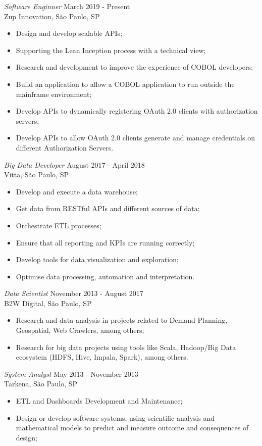 \documentclass[margin, 10pt]{res} %
\begin{document}
\begin{resume}
{\sl Software Enginner} \hfill March 2019 - Present \\
Zup Innovation, São Paulo, SP
\begin{itemize} \itemsep -2pt %
\item Design and develop scalable APIs;
\item Supporting the Lean Inception process with a technical view;
\item Research and development to improve the experience of COBOL developers;
\item Build an application to allow a COBOL application to run outside the mainframe environment;
\item Develop APIs to dynamically registering OAuth 2.0 clients with authorization servers;
\item Develop APIs to allow OAuth 2.0 clients generate and manage credentials on different Authorization Servers.
\end{itemize}

{\sl Big Data Developer} \hfill August 2017 - April 2018 \\
Vitta, São Paulo, SP
\begin{itemize} \itemsep -2pt %
\item Develop and execute a data warehouse;
\item Get data from RESTful APIs and different sources of data;
\item Orchestrate ETL processes;
\item Ensure that all reporting and KPIs are running correctly;
\item Develop tools for data visualization and exploration;
\item Optimise data processing, automation and interpretation.
\end{itemize}

{\sl Data Scientist} \hfill November 2013 - August 2017 \\
B2W Digital, São Paulo, SP
\begin{itemize} \itemsep -2pt %
\item Research and data analysis in projects related to Demand Planning, Geospatial, Web Crawlers, among others;
\item Research for big data projects using tools like Scala, Hadoop/Big Data ecosystem (HDFS, Hive, Impala, Spark), among others.
\end{itemize}

{\sl System Analyst} \hfill May 2013 - November 2013 \\
Tarkena, São Paulo, SP
\begin{itemize} \itemsep -2pt %
\item ETL and Dashboards Development and Maintenance;
\item Design or develop software systems, using scientific analysis and mathematical models to predict and measure outcome and consequences of design;
\end{itemize}


\end{resume}
\end{document}
